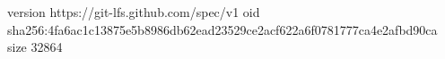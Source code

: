 version https://git-lfs.github.com/spec/v1
oid sha256:4fa6ac1c13875e5b8986db62ead23529ce2acf622a6f0781777ca4e2afbd90ca
size 32864
